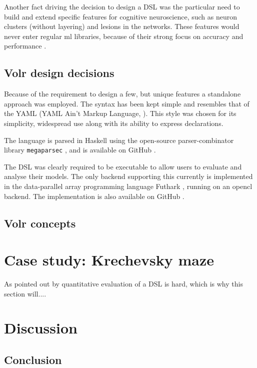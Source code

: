 \documentclass[a4paper,oneside]{memoir}
\begin{document}
Another fact driving the decision to design a DSL was the particular need to
build and extend specific features for cognitive neuroscience, such as
neuron clusters (without layering) and lesions in the networks. These features
would never enter regular \gls{ml} libraries, because of their strong
focus on accuracy and performance \autocite{Nilsson2009, schmidhuber2014}.

\section{Volr design decisions}
Because of the requirement to design a few, but unique features a standalone
approach was employed. The syntax has been kept simple and resembles that of
the YAML (YAML Ain't Markup Language, \cite{yaml}). This style was chosen for
its simplicity, widespread use along with its ability to express declarations.

The language is parsed in Haskell using the open-source parser-combinator
library \texttt{megaparsec} \autocite{mepaparsec}, and is available on GitHub
\autocite{Pedersen2018:volr}.

The DSL was clearly required to be executable to allow users to evaluate and
analyse their models. The only backend supporting this currently is implemented
in the data-parallel array programming language Futhark
\autocite{Henriksen2017}, running on an \gls{opencl} backend. The implementation
is also available on GitHub \autocite{Pedersen2018:futhark}.

\section{Volr concepts}


{\let\clearpage\relax\chapter{Case study: Krechevsky maze}}
\label{case}

As pointed out by \cite{Mernik2005} quantitative evaluation of a DSL is hard,
which is why this section will....

\chapter{Discussion}

\section{Conclusion}
\end{document}
